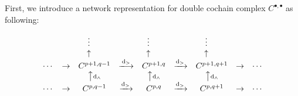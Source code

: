 \documentclass[reprint,amsmath,amssymb,aps,pra,]{revtex4-1}
\newcommand{\dd}{\mathrm{d}} %
\begin{document}
First, we introduce a network representation for double cochain complex $C^{\bullet,\bullet}$ as following:
\begin{widetext}
  \begin{align}
    \begin{matrix}
      & & \vdots\quad\  & & \vdots\quad\ & & \vdots\quad\ & &\notag\\
      & & \uparrow\quad\  & & \uparrow\quad\ & & \uparrow\quad\ & &\notag\\
    \cdots & \rightarrow & C^{p+1,q-1} & \xlongrightarrow{\dd_>} & C^{p+1,q} & \xrightarrow{\dd_>} & C^{p+1,q+1} & \rightarrow & \cdots\notag\\
    & & \big\uparrow \text{\scriptsize$\dd_\wedge$} & & \big\uparrow \text{\scriptsize$\dd_\wedge$} && \big\uparrow  \text{\scriptsize$\dd_\wedge$} & & \notag\\
    \cdots & \rightarrow & C^{p,q-1} & \xrightarrow{\dd_>} & C^{p,q} & \xrightarrow{\dd_>} & C^{p,q+1} & \rightarrow & \cdots\notag\\

\end{matrix}
\end{align}
\end{widetext}
\end{document}
